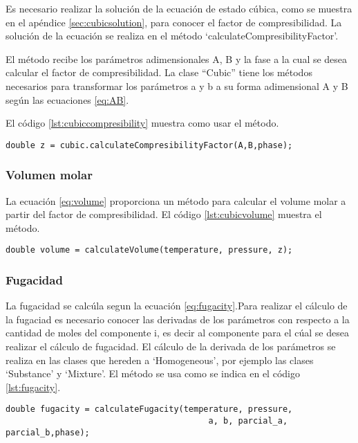 	Es necesario realizar la solución de la ecuación de estado cúbica, como se muestra en el apéndice \ref{sec:cubicsolution}, para conocer el factor de compresibilidad. La solución de la ecuación se realiza en el método `calculateCompresibilityFactor'.

	El método recibe los parámetros adimensionales A, B y la fase a la cual se desea calcular el factor de compresibilidad. La clase ``Cubic'' tiene los métodos necesarios para transformar los parámetros a y b a su forma adimensional A y B según las ecuaciones \ref{eq:AB}.

	El código \ref{lst:cubiccompresibility} muestra como usar el método.
\begin{lstlisting}[label={lst:cubiccompresibility},caption={Cálculo del factor de compresibilidad con una ecuación de estado cúbica, proporcionando como argumento los parámetros adimensionales $A$,$B$, y la fase a la cual se desea calcular el factor}]
	double z = cubic.calculateCompresibilityFactor(A,B,phase);
\end{lstlisting}
	\subsubsection{Volumen molar}

	La ecuación \ref{eq:volume} proporciona un método para calcular el volume molar a partir del factor de compresibilidad. El código \ref{lst:cubicvolume} muestra el método.
\begin{lstlisting}[label={lst:cubicvolume},caption={Cálculo del volumen molar usando una ecuación de estado cúbica, el método recibe los parámetros de temperatura, presión y factor acéntrico}]
	double volume = calculateVolume(temperature, pressure, z);
\end{lstlisting}	
	\subsubsection{Fugacidad}
	La fugacidad se calcúla segun la ecuación \ref{eq:fugacity}.Para realizar el cálculo de la fugaciad es necesario conocer las derivadas de los parámetros con respecto a la cantidad de moles del componente i, es decir al componente para el cúal se desea realizar el cálculo de fugacidad. El cálculo de la derivada de los parámetros se realiza en las clases que hereden a `Homogeneous', por ejemplo las clases `Substance' y `Mixture'.
	El método se usa como se indica en el código \ref{lst:fugacity}.
\begin{lstlisting}[label={lst:fugacity},caption={Cálculo de fugacidad usando una ecuación de estad cúbica, el método recibe los parámetros de temperatura, presión ,los parámetros de la ecuación cúbica $a$ y $b$, las derivadas con respecto a la cantidad de moles $partial_a$, $partial_b$ y finalmente la fase a la que se desea el cálculo de la fugacidad.}]
	double fugacity = calculateFugacity(temperature, pressure,
										 a, b, parcial_a, parcial_b,phase);
\end{lstlisting}


